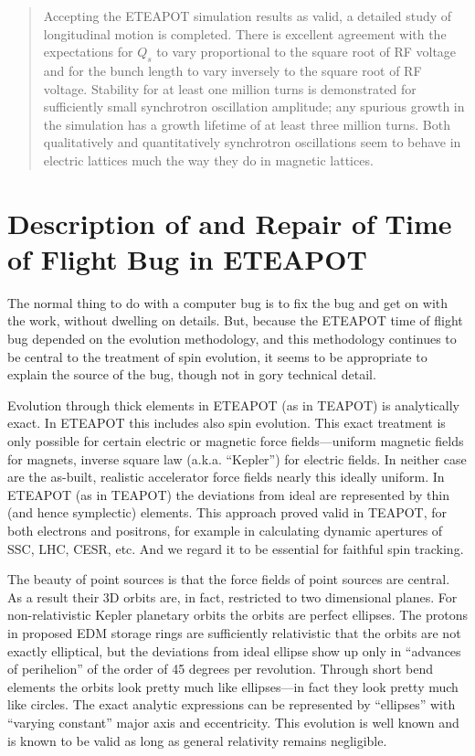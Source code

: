 \documentclass[]{article}
\begin{document}
\begin{abstract}
Accepting the ETEAPOT simulation results as valid, a detailed study of longitudinal
motion is completed. There is excellent agreement with the expectations for $Q_s$ to 
vary proportional to the square root of RF voltage and for the bunch length to vary 
inversely to the square root of RF voltage.
Stability for at least one million turns is demonstrated for 
sufficiently small synchrotron oscillation amplitude; any spurious growth 
in the simulation has a growth lifetime of at least three million turns.
Both qualitatively and quantitatively synchrotron oscillations seem to behave
in electric lattices much the way they do in magnetic lattices.
\end{abstract}
%


\clearpage

\section{Description of and Repair of Time of Flight Bug in ETEAPOT}
The normal thing to do with a computer bug is to fix the bug and get on with
the work, without dwelling on details. But, because the ETEAPOT time of
flight bug depended on the evolution methodology, and this methodology
continues to be central to the treatment of spin evolution, it seems to be
appropriate to explain the source of the bug, though not in gory technical 
detail.

Evolution through thick elements in ETEAPOT (as in TEAPOT) is analytically
exact. In ETEAPOT this includes also spin evolution.
This exact treatment is only possible for certain electric or magnetic 
force fields---uniform magnetic fields for magnets, inverse square law 
(a.k.a. ``Kepler'') for electric fields. In neither case are the as-built,
realistic
accelerator force fields nearly this ideally uniform. In ETEAPOT 
(as in TEAPOT) the deviations from ideal are represented by thin
(and hence symplectic) elements. This approach proved valid in TEAPOT,
for both electrons and positrons, for example in calculating dynamic 
apertures of SSC, LHC, CESR, etc. And we regard it to be essential
for faithful spin tracking.

The beauty of point sources is that the force fields of point sources
are central. As
a result their 3D orbits are, in fact, restricted to two dimensional
planes. For non-relativistic Kepler planetary orbits the orbits are
perfect ellipses. The protons in proposed EDM storage rings are
sufficiently relativistic that the orbits are not exactly elliptical,
but the deviations from ideal ellipse show up only in ``advances of
perihelion'' of the order of 45 degrees per revolution. Through short
bend elements the orbits look pretty much like ellipses---in fact they
look pretty much like circles. The exact analytic expressions can
be represented by ``ellipses'' with ``varying constant'' major axis and 
eccentricity. This evolution is well known and is known to be valid
as long as general relativity remains negligible.
\end{document}
